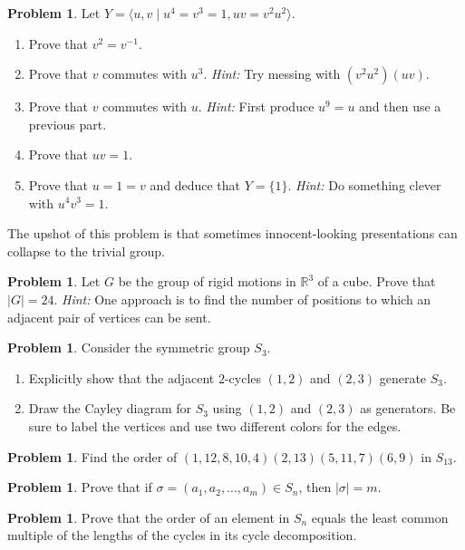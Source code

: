 \documentclass[11pt]{scrartcl}
\theoremstyle{definition}
\newtheorem{problem}[theorem]{Problem}
\begin{document}
\begin{problem}
Let $Y=\langle u,v\mid u^4=v^3=1,uv=v^2u^2\rangle$.
\begin{enumerate}[label=\rm{(\alph*)}]
\item Prove that $v^2=v^{-1}$.
\item Prove that $v$ commutes with $u^3$. \emph{Hint:} Try messing with $(v^2u^2)(uv)$.
\item Prove that $v$ commutes with $u$.  \emph{Hint:} First produce $u^9=u$ and then use a previous part.
\item Prove that $uv=1$.
\item Prove that $u=1=v$ and deduce that $Y=\{1\}$.  \emph{Hint:} Do something clever with $u^4v^3=1$.
\end{enumerate}
The upshot of this problem is that sometimes innocent-looking presentations can collapse to the trivial group.
\end{problem}

\begin{problem}
Let $G$ be the group of rigid motions in $\mathbb{R}^3$ of a cube.  Prove that $|G|=24$. \emph{Hint:} One approach is to find the number of positions to which an adjacent pair of vertices can be sent.
\end{problem}

\begin{problem}
Consider the symmetric group $S_3$.
\begin{enumerate}[label=\rm{(\alph*)}]
\item Explicitly show that the adjacent $2$-cycles $(1,2)$ and $(2,3)$ generate $S_3$.
\item Draw the Cayley diagram for $S_3$ using $(1,2)$ and $(2,3)$ as generators. Be sure to label the vertices and use two different colors for the edges.
\end{enumerate}
\end{problem}

\begin{problem}
Find the order of $(1,12,8,10,4)(2,13)(5,11,7)(6,9)$ in $S_{13}$.
\end{problem}

\begin{problem}
Prove that if $\sigma=(a_1,a_2,\ldots,a_m)\in S_n$, then $|\sigma|=m$.
\end{problem}

\begin{problem}
Prove that the order of an element in $S_n$ equals the least common multiple of the lengths of the cycles in its cycle decomposition.
\end{problem}
\end{document}
